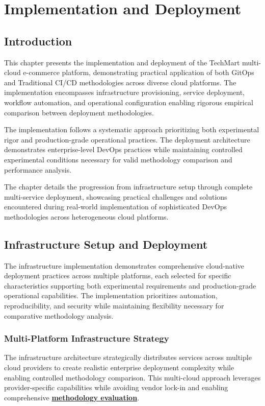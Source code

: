 \chapter{Implementation and Deployment}

\section{Introduction}

This chapter presents the implementation and deployment of the TechMart multi-cloud e-commerce platform, demonstrating practical application of both GitOps and Traditional CI/CD methodologies across diverse cloud platforms. The implementation encompasses infrastructure provisioning, service deployment, workflow automation, and operational configuration enabling rigorous empirical comparison between deployment methodologies.

The implementation follows a systematic approach prioritizing both experimental rigor and production-grade operational practices. The deployment architecture demonstrates enterprise-level DevOps practices while maintaining controlled experimental conditions necessary for valid methodology comparison and performance analysis.

The chapter details the progression from infrastructure setup through complete multi-service deployment, showcasing practical challenges and solutions encountered during real-world implementation of sophisticated DevOps methodologies across heterogeneous cloud platforms.

\section{Infrastructure Setup and Deployment}

The infrastructure implementation demonstrates comprehensive cloud-native deployment practices across multiple platforms, each selected for specific characteristics supporting both experimental requirements and production-grade operational capabilities. The implementation prioritizes automation, reproducibility, and security while maintaining flexibility necessary for comparative methodology analysis.

\subsection{Multi-Platform Infrastructure Strategy}

The infrastructure architecture strategically distributes services across multiple cloud providers to create realistic enterprise deployment complexity while enabling controlled methodology comparison. This multi-cloud approach leverages provider-specific capabilities while avoiding vendor lock-in and enabling comprehensive \textbf{\hyperref[multicloud_patterns2023]{methodology evaluation}}.


